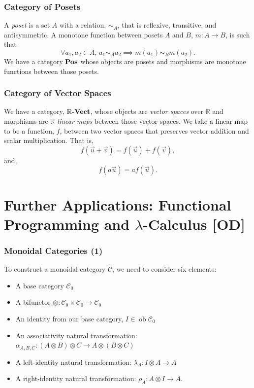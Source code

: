 \documentclass{beamer}
\numberwithin{figure}{section}
\DeclareMathOperator{\catobj}{ob}
\DeclareMathOperator{\catpos}{\text{\textbf{Pos}}}
\DeclareMathOperator{\rvect}{\mathbb{R} \text{\textbf{-Vect}}}
\begin{document}
\begin{frame}
        \frametitle{Category of Posets}
        A \emph{poset} is a set $A$ with a relation, $\sim _A$, that is
        reflexive, transitive, and antisymmetric. A monotone function between
        posets $A$ and $B$, $m \colon A \to B$, is such that
        \begin{equation*}
                \forall a_1, a_2 \in A, \, a_1 \sim _A a_2 \implies m(a_1) \sim
                _B m(a_2).
        \end{equation*}
        We have a category $\catpos$ whose objects are posets and morphisms are
        monotone functions between those posets.
\end{frame}

\begin{frame}
        \frametitle{Category of Vector Spaces}
        We have a category, $\rvect$, whose objects are \emph{vector spaces} over
        $\mathbb{R}$ and morphisms are $\mathbb{R}$\emph{-linear maps} between
        those vector spaces. We take a linear map to be a function, $f$, between
        two vector spaces that preserves vector addition and scalar
        multiplication. That is,
        \[
                f( \vec{u} + \vec{v} ) = f( \vec{u} ) + f( \vec{v} ) ,
        \]
        and,
        \[
                f( a \vec{u} ) = af( \vec{u} ) .
        \]
\end{frame}

\section[Further Applications: Func. Prog. \protect\& Lambda-Calculus {[OD]}]%
        {Further Applications: Functional Programming and
        \texorpdfstring{$\lambda$}{Lambda}-Calculus [OD]}
\begin{frame}
        \frametitle{Monoidal Categories (1)}
        To construct a monoidal category $\mathcal{C}$, we need to consider six
        elements:
        \begin{itemize}[<+->]
                \item A base category $\mathcal{C}_0$
                \item A bifunctor $\otimes:\mathcal{C}_0 \times \mathcal{C}_0
                        \to \mathcal{C}_0$
                \item An identity from our base category, $I \in \catobj
                \mathcal{C}_0$
                \item An associativity natural transformation:
                        $\alpha_{A,B,C} : (A \otimes B) \otimes C \to A \otimes
                        (B \otimes C)$
                \item A left-identity natural transformation:
                        $\lambda_A: I \otimes A \to A$
                \item A right-identity natural transformation:
                        $\rho_A: A \otimes I \to A$.
        \end{itemize}
\end{frame}
\end{document}
